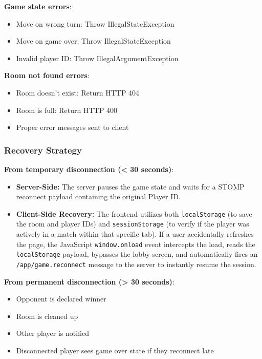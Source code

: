 \documentclass{scrartcl}
\begin{document}
\textbf{Game state errors}:

\begin{itemize}
  \item Move on wrong turn: Throw IllegalStateException
  \item Move on game over: Throw IllegalStateException
  \item Invalid player ID: Throw IllegalArgumentException
\end{itemize}

\textbf{Room not found errors}:

\begin{itemize}
  \item Room doesn't exist: Return HTTP 404
  \item Room is full: Return HTTP 400
  \item Proper error messages sent to client
\end{itemize}

\subsubsection{Recovery Strategy}

\textbf{From temporary disconnection (< 30 seconds)}:

\begin{itemize}
  \item \textbf{Server-Side:} The server pauses the game state and waits for a STOMP reconnect payload containing the original Player ID.
  \item \textbf{Client-Side Recovery:} The frontend utilizes both \texttt{localStorage} (to save the room and player IDs) and \texttt{sessionStorage} (to verify if the player was actively in a match within that specific tab). If a user accidentally refreshes the page, the JavaScript \texttt{window.onload} event intercepts the load, reads the \texttt{localStorage} payload, bypasses the lobby screen, and automatically fires an \texttt{/app/game.reconnect} message to the server to instantly resume the session.
\end{itemize}

\textbf{From permanent disconnection (> 30 seconds)}:

\begin{itemize}
  \item Opponent is declared winner
  \item Room is cleaned up
  \item Other player is notified
  \item Disconnected player sees game over state if they reconnect late
\end{itemize}
\end{document}
